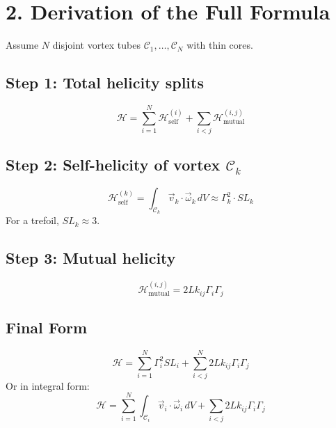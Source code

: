 \documentclass[12pt]{article}
\begin{document}
    \section*{2. Derivation of the Full Formula}
    Assume $N$ disjoint vortex tubes $\mathcal{C}_1, \dots, \mathcal{C}_N$ with thin cores.

    \subsection*{Step 1: Total helicity splits}
    \begin{equation}
        \mathcal{H} = \sum_{i=1}^N \mathcal{H}_{\text{self}}^{(i)} + \sum_{i < j} \mathcal{H}_{\text{mutual}}^{(i,j)}
    \end{equation}

    \subsection*{Step 2: Self-helicity of vortex $\mathcal{C}_k$}
    \begin{equation}
        \mathcal{H}_{\text{self}}^{(k)} = \int_{\mathcal{C}_k} \vec{v}_k \cdot \vec{\omega}_k \, dV \approx \Gamma_k^2 \cdot SL_k
    \end{equation}
    For a trefoil, $SL_k \approx 3$.

    \subsection*{Step 3: Mutual helicity}
    \begin{equation}
        \mathcal{H}_{\text{mutual}}^{(i,j)} = 2 Lk_{ij} \Gamma_i \Gamma_j
    \end{equation}

    \subsection*{Final Form}
    \begin{equation}
        \boxed{
            \mathcal{H} = \sum_{i=1}^{N} \Gamma_i^2 SL_i + \sum_{i < j}^{N} 2 Lk_{ij} \Gamma_i \Gamma_j
        }
    \end{equation}
    Or in integral form:
    \begin{equation}
        \boxed{
            \mathcal{H} = \sum_{i=1}^{N} \int_{\mathcal{C}_i} \vec{v}_i \cdot \vec{\omega}_i \, dV + \sum_{i < j} 2 Lk_{ij} \Gamma_i \Gamma_j
        }
    \end{equation}
\end{document}
